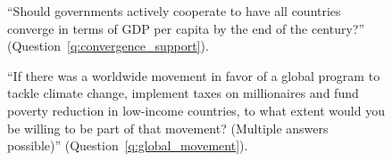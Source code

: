 \begin{figure}[h!]
    \caption[Support for making all countries' GDP p.c. converge by 2100]{``Should governments actively cooperate to have all countries converge in terms of GDP per capita by the end of the century?'' (Question~\ref{q:convergence_support}).
    }\label{fig:convergence_support}
\end{figure}

\begin{figure}[h!]
    \caption[Willingness to participate in a global movement for sustainable development]{``If there was a worldwide movement in favor of a global program to tackle climate change, implement taxes on millionaires and fund poverty reduction in low-income countries, to what extent would you be willing to be part of that movement? (Multiple answers possible)'' (Question~\ref{q:global_movement}).
    }\label{fig:global_movement}
\end{figure}

